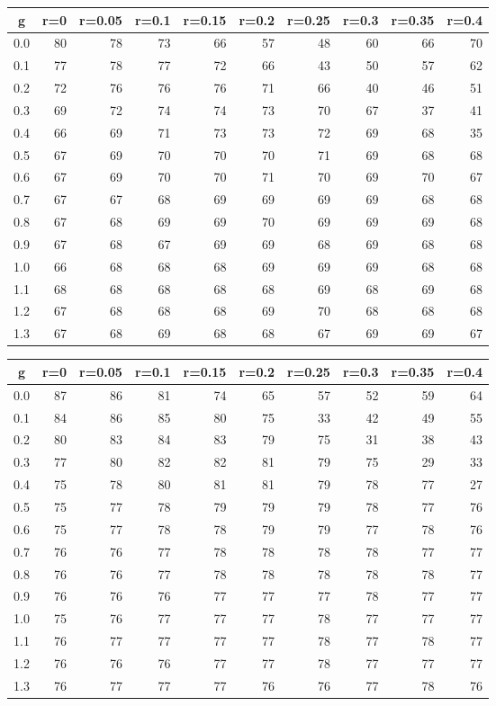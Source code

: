 %
\begin{table}[!tbp]
 \begin{center}
 \begin{tabular}{rrrrrrrrrr}\hline\hline
\multicolumn{1}{c}{g}&\multicolumn{1}{c}{r=0}&\multicolumn{1}{c}{r=0.05}&\multicolumn{1}{c}{r=0.1}&\multicolumn{1}{c}{r=0.15}&\multicolumn{1}{c}{r=0.2}&\multicolumn{1}{c}{r=0.25}&\multicolumn{1}{c}{r=0.3}&\multicolumn{1}{c}{r=0.35}&\multicolumn{1}{c}{r=0.4}\tabularnewline
\hline
0.0&80&78&73&66&57&48&60&66&70\tabularnewline
0.1&77&78&77&72&66&43&50&57&62\tabularnewline
0.2&72&76&76&76&71&66&40&46&51\tabularnewline
0.3&69&72&74&74&73&70&67&37&41\tabularnewline
0.4&66&69&71&73&73&72&69&68&35\tabularnewline
0.5&67&69&70&70&70&71&69&68&68\tabularnewline
0.6&67&69&70&70&71&70&69&70&67\tabularnewline
0.7&67&67&68&69&69&69&69&68&68\tabularnewline
0.8&67&68&69&69&70&69&69&69&68\tabularnewline
0.9&67&68&67&69&69&68&69&68&68\tabularnewline
1.0&66&68&68&68&69&69&69&68&68\tabularnewline
1.1&68&68&68&68&68&69&68&69&68\tabularnewline
1.2&67&68&68&68&69&70&68&68&68\tabularnewline
1.3&67&68&69&68&68&67&69&69&67\tabularnewline
\hline
\end{tabular}

\end{center}

\end{table}

%
\begin{table}[!tbp]
 \begin{center}
 \begin{tabular}{rrrrrrrrrr}\hline\hline
\multicolumn{1}{c}{g}&\multicolumn{1}{c}{r=0}&\multicolumn{1}{c}{r=0.05}&\multicolumn{1}{c}{r=0.1}&\multicolumn{1}{c}{r=0.15}&\multicolumn{1}{c}{r=0.2}&\multicolumn{1}{c}{r=0.25}&\multicolumn{1}{c}{r=0.3}&\multicolumn{1}{c}{r=0.35}&\multicolumn{1}{c}{r=0.4}\tabularnewline
\hline
0.0&87&86&81&74&65&57&52&59&64\tabularnewline
0.1&84&86&85&80&75&33&42&49&55\tabularnewline
0.2&80&83&84&83&79&75&31&38&43\tabularnewline
0.3&77&80&82&82&81&79&75&29&33\tabularnewline
0.4&75&78&80&81&81&79&78&77&27\tabularnewline
0.5&75&77&78&79&79&79&78&77&76\tabularnewline
0.6&75&77&78&78&79&79&77&78&76\tabularnewline
0.7&76&76&77&78&78&78&78&77&77\tabularnewline
0.8&76&76&77&78&78&78&78&78&77\tabularnewline
0.9&76&76&76&77&77&77&78&77&77\tabularnewline
1.0&75&76&77&77&77&78&77&77&77\tabularnewline
1.1&76&77&77&77&77&78&77&78&77\tabularnewline
1.2&76&76&76&77&77&78&77&77&77\tabularnewline
1.3&76&77&77&77&76&76&77&78&76\tabularnewline
\hline
\end{tabular}

\end{center}

\end{table}

